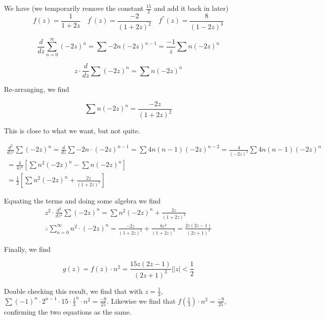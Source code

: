 \documentclass{article}
\begin{document}
We have (we temporarily remove the constant $\frac{15}{2}$ and add it back in later)
\[
f(z) = \frac{1}{1+2z} \quad f^{'}(z) = \frac{-2}{(1+2z)^2} \quad f^{''}(z) = \frac{8}{(1-2z)^3}
\]

\[
\frac{d}{dz} \sum_{n=0}^{\infty} (-2z)^n = \sum -2n(-2z)^{n-1} = \frac{-1}{z} \sum n(-2z)^n
\]

\[
z \cdot \frac{d}{dz} \sum (-2z)^n = \sum n(-2z)^n
\]

Re-arranging, we find

\[
\sum n(-2z)^n = \frac{-2z}{(1+2z)^2}
\]

This is close to what we want, but not quite.

\begin{align*}
\frac{d^2}{dz^2} \sum (-2z)^n = \frac{d}{dz} \sum -2n \cdot (-2z)^{n-1} = \sum 4n(n-1)(-2z)^{n-2} = \frac{4}{(-2z)^2} \sum 4n(n-1)(-2z)^n\\
= \frac{4}{4z^2} \left[ \sum n^2(-2z)^n - \sum n(-2z)^n\right]\\
= \frac{1}{2} \left[ \sum n^2(-2z)^n + \frac{2z}{(1+2z)^2}\right]
\end{align*}

Equating the terms and doing some algebra we find
\begin{align*}
z^2 \cdot \frac{d^2}{dz^2} \sum (-2z)^n = \sum n^2(-2z)^n + \frac{2z}{(1+2z)^2}\\
\therefore \sum_{n=0}^{\infty} n^2 \cdot (-2z)^n = \frac{-2z}{(1+2z)^2} + \frac{8z^2}{(1+2z)^3} = \frac{2z(2z-1)}{(2z+1)^3}
\end{align*}

Finally, we find

\[
g(z) = f(z) \cdot n^2 = \frac{15z(2z-1)}{(2z+1)^3} \Bigr| \left|z\right| < \frac{1}{2}
\]

Double checking this result, we find that with $z = \frac{1}{3}$, $\sum (-1)^n \cdot 2^{n-1} \cdot 15 \cdot \frac{1}{3}^n \cdot n^2 = \frac{-9}{25}$.
Likewise we find that $f(\frac{1}{3}) \cdot n^2 = \frac{-9}{25}$, confirming the two equations as the same.
\end{document}
